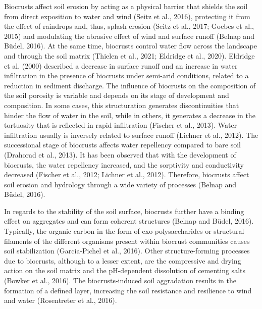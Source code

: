 {Biocrusts affect soil erosion by acting as a physical barrier that shields the soil from direct exposition to water and wind (Seitz et al., 2016), protecting it from the effect of raindrops and, thus, splash erosion (Seitz et al., 2017; Goebes et al., 2015) and modulating the abrasive effect of wind and surface runoff (Belnap and Büdel, 2016). At the same time, biocrusts control water flow across the landscape and through the soil matrix (Thielen et al., 2021; Eldridge et al., 2020). Eldridge et al. (2000) described a decrease in surface runoff and an increase in water infiltration in the presence of biocrusts under semi-arid conditions, related to a reduction in sediment discharge. The influence of biocrusts on the composition of the soil porosity is variable and depends on its stage of development and composition. In some cases, this structuration generates discontinuities that hinder the flow of water in the soil, while in others, it generates a decrease in the tortuosity that is reflected in rapid infiltration (Fischer et al., 2013). Water infiltration usually is inversely related to surface runoff (Lichner et al., 2012). The successional stage of biocrusts affects water repellency compared to bare soil (Drahorad et al., 2013). It has been observed that with the development of biocrusts, the water repellency increased, and the sorptivity and conductivity decreased (Fischer et al., 2012; Lichner et al., 2012). Therefore, biocrusts affect soil erosion and hydrology through a wide variety of processes (Belnap and Büdel, 2016).

In regards to the stability of the soil surface, biocrusts further have a binding effect on aggregates and can form coherent structures (Belnap and Büdel, 2016). Typically, the organic carbon in the form of exo-polysaccharides or structural filaments of the different organisms present within biocrust communities causes soil stabilization (Garcia-Pichel et al., 2016). Other structure-forming processes due to biocrusts, although to a lesser extent, are the compressive and drying action on the soil matrix and the pH-dependent dissolution of cementing salts (Bowker et al., 2016). The biocrusts-induced soil aggradation results in the formation of a defined layer, increasing the soil resistance and resilience to wind and water (Rosentreter et al., 2016).

}
